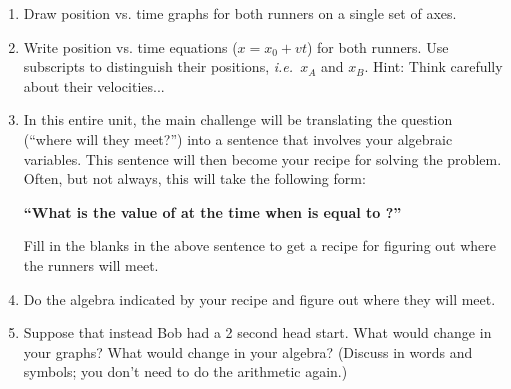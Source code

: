 \documentclass[12pt]{article}
\newcommand{\ie}{{\em i.e.\ }}
\begin{document}
\begin{enumerate}

\item Draw position vs. time graphs for both runners on a single set of axes.

\begin{center}




\end{center}

\item Write position vs. time equations ($x=x_0 + vt$) for both runners. Use subscripts to distinguish their positions, \ie $x_A$ and $x_B$. Hint: Think carefully about their velocities...

\vspace{1.5in}

\item In this entire unit, the main challenge will be translating the question (``where will they meet?'') into a sentence that involves your algebraic variables. This sentence will then become your recipe for solving the problem.
Often, but not always, this will take the following form: 

\begin{center}
{\bf ``What is the value of \underline{\hspace{0.7in}} at the time when \underline{\hspace{0.7in}} is equal to \underline{\hspace{0.7in}}?''} 
\end{center}

Fill in the blanks in the above sentence to get a recipe for figuring out where the runners will meet.

\item Do the algebra indicated by your recipe and figure out where they will meet.

\vspace{2in}

\item Suppose that instead Bob had a 2 second head start. What would change in your graphs? What would change in your algebra? (Discuss in words and symbols; you don't need to do the arithmetic again.)
\end{enumerate}
\end{document}
